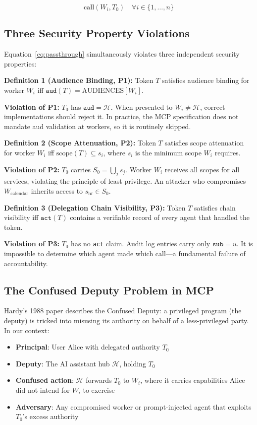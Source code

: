 \documentclass[journal]{IEEEtran}
\begin{document}
\begin{equation}
\text{call}(W_i, T_0) \quad \forall i \in \{1,\ldots,n\}
\label{eq:passthrough}
\end{equation}

\subsection{Three Security Property Violations}

Equation~\ref{eq:passthrough} simultaneously violates three independent security properties:

\textbf{Definition 1 (Audience Binding, P1):} Token $T$ satisfies audience binding for worker $W_i$ iff $\texttt{aud}(T) = \text{AUDIENCES}[W_i]$.

\textbf{Violation of P1:} $T_0$ has $\texttt{aud} = \mathcal{H}$. When presented to $W_i \neq \mathcal{H}$, correct implementations should reject it. In practice, the MCP specification does not mandate aud validation at workers, so it is routinely skipped.

\textbf{Definition 2 (Scope Attenuation, P2):} Token $T$ satisfies scope attenuation for worker $W_i$ iff $\text{scope}(T) \subseteq s_i$, where $s_i$ is the minimum scope $W_i$ requires.

\textbf{Violation of P2:} $T_0$ carries $S_0 = \bigcup_j s_j$. Worker $W_i$ receives all scopes for all services, violating the principle of least privilege. An attacker who compromises $W_{\text{calendar}}$ inherits access to $s_{\text{hr}} \in S_0$.

\textbf{Definition 3 (Delegation Chain Visibility, P3):} Token $T$ satisfies chain visibility iff $\texttt{act}(T)$ contains a verifiable record of every agent that handled the token.

\textbf{Violation of P3:} $T_0$ has no \texttt{act} claim. Audit log entries carry only $\texttt{sub} = u$. It is impossible to determine which agent made which call—a fundamental failure of accountability.

\subsection{The Confused Deputy Problem in MCP}

Hardy's 1988 paper \cite{hardy1988} describes the Confused Deputy: a privileged program (the deputy) is tricked into misusing its authority on behalf of a less-privileged party. In our context:

\begin{itemize}
  \item \textbf{Principal}: User Alice with delegated authority $T_0$
  \item \textbf{Deputy}: The AI assistant hub $\mathcal{H}$, holding $T_0$
  \item \textbf{Confused action}: $\mathcal{H}$ forwards $T_0$ to $W_i$, where it carries capabilities Alice did not intend for $W_i$ to exercise
  \item \textbf{Adversary}: Any compromised worker or prompt-injected agent that exploits $T_0$'s excess authority
\end{itemize}
\end{document}
